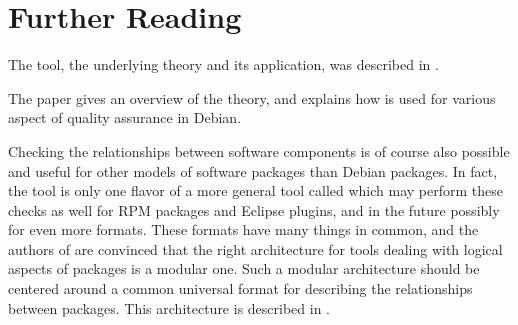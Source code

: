 
\section{Further Reading}
The \debcheck{} tool, the underlying theory and its application, was
described in \cite{edos2006ase}.

The paper \cite{edos-debconf08} gives an overview of the theory, and
explains how \debcheck{} is used for various aspect of quality
assurance in Debian.


Checking the relationships between software components is of course
also possible and useful for other models of software packages than
Debian packages. In fact, the \debcheck{} tool is only one flavor of a
more general tool called \distcheck{} which may perform these checks
as well for RPM packages and Eclipse plugins, and in the future
possibly for even more formats. These formats have many things in
common, and the authors of \debcheck{} are convinced that the right
architecture for tools dealing with logical aspects of packages is a
modular one. Such a modular architecture should be centered around a
common universal format for describing the relationships between
packages. This architecture is described in \cite{mpm-cbse11}.


